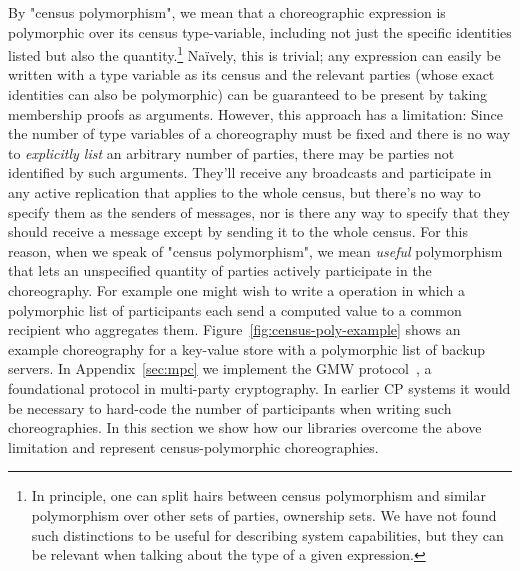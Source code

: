 By "census polymorphism", we mean that a choreographic expression is polymorphic over its census type-variable,
including not just the specific identities listed but also the quantity.\footnote{
    In principle, one can split hairs between census polymorphism and similar polymorphism over other sets of parties, \eg ownership sets.
    We have not found such distinctions to be useful for describing system capabilities,
    but they can be relevant when talking about the type of a given expression.
}
Naïvely, this is trivial; any \MultiChor expression can easily be written with a type variable as its census
and the relevant parties (whose exact identities can also be polymorphic) can be guaranteed to be present by taking
membership proofs as arguments.
However, this approach has a limitation: Since the number of type variables of a choreography must be fixed
and there is no way to \emph{explicitly list} an arbitrary number of parties,
there may be parties not identified by such arguments.
They'll receive any broadcasts and participate in any active replication that applies to the whole census,
but there's no way to specify them as the senders of messages, nor is there any way to specify that they should receive a message
except by sending it to the whole census.
For this reason, when we speak of "census polymorphism",
we mean \emph{useful} polymorphism that lets an unspecified quantity of parties actively participate in the choreography.
For example one might wish to write a  operation
in which a polymorphic list of participants each send a computed value to a common recipient who aggregates them.
Figure~\ref{fig:census-poly-example} shows an example \MultiChor choreography for a key-value store with a polymorphic list of backup servers.
In Appendix~\ref{sec:mpc} we implement the GMW protocol~\cite{goldreich2019play}, a foundational protocol in multi-party cryptography.
In earlier CP systems it would be necessary to hard-code the number of participants when writing such choreographies.
In this section we show how our libraries overcome the above limitation and represent census-polymorphic choreographies.

